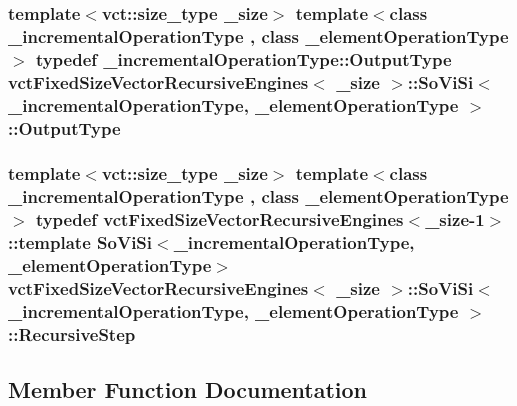 \subsubsection[{Output\+Type}]{\setlength{\rightskip}{0pt plus 5cm}template$<$vct\+::size\+\_\+type \+\_\+size$>$ template$<$class \+\_\+incremental\+Operation\+Type , class \+\_\+element\+Operation\+Type $>$ typedef \+\_\+incremental\+Operation\+Type\+::\+Output\+Type {\bf vct\+Fixed\+Size\+Vector\+Recursive\+Engines}$<$ \+\_\+size $>$\+::{\bf So\+Vi\+Si}$<$ \+\_\+incremental\+Operation\+Type, \+\_\+element\+Operation\+Type $>$\+::{\bf Output\+Type}}\label{classvct_fixed_size_vector_recursive_engines_1_1_so_vi_si_a44d1ef1068c419fc926e4fd821d08402}
\hypertarget{classvct_fixed_size_vector_recursive_engines_1_1_so_vi_si_a595f643d9cca8d3c8a84a4c680679ad0}{}
\subsubsection[{Recursive\+Step}]{\setlength{\rightskip}{0pt plus 5cm}template$<$vct\+::size\+\_\+type \+\_\+size$>$ template$<$class \+\_\+incremental\+Operation\+Type , class \+\_\+element\+Operation\+Type $>$ typedef {\bf vct\+Fixed\+Size\+Vector\+Recursive\+Engines}$<$\+\_\+size-\/1$>$\+::template {\bf So\+Vi\+Si}$<$\+\_\+incremental\+Operation\+Type, \+\_\+element\+Operation\+Type$>$ {\bf vct\+Fixed\+Size\+Vector\+Recursive\+Engines}$<$ \+\_\+size $>$\+::{\bf So\+Vi\+Si}$<$ \+\_\+incremental\+Operation\+Type, \+\_\+element\+Operation\+Type $>$\+::{\bf Recursive\+Step}}\label{classvct_fixed_size_vector_recursive_engines_1_1_so_vi_si_a595f643d9cca8d3c8a84a4c680679ad0}


\subsection{Member Function Documentation}
\hypertarget{classvct_fixed_size_vector_recursive_engines_1_1_so_vi_si_a06e896ac6b470c5cf0427ab841c7c75c}{}
